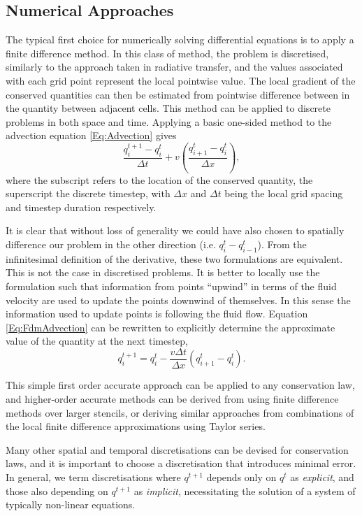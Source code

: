 \subsection{Numerical Approaches}

The typical first choice for numerically solving differential equations is to apply a finite difference method.
In this class of method, the problem is discretised, similarly to the approach taken in radiative transfer, and the values associated with each grid point represent the local pointwise value.
The local gradient of the conserved quantities can then be estimated from pointwise difference between in the quantity between adjacent cells.
This method can be applied to discrete problems in both space and time.
Applying a basic one-sided method to the advection equation \eqref{Eq:Advection} gives
\begin{equation}\label{Eq:FdmAdvection}
    \frac{q^{t+1}_i - q^t_i}{\Delta t} + v\left( \frac{q^t_{i+1} - q^t_i}{\Delta x} \right),
\end{equation}
where the subscript refers to the location of the conserved quantity, the superscript the discrete timestep, with $\Delta x$ and $\Delta t$ being the local grid spacing and timestep duration respectively.

It is clear that without loss of generality we could have also chosen to spatially difference our problem in the other direction (i.e. $q^t_i - q^t_{i-1}$).
From the infinitesimal definition of the derivative, these two formulations are equivalent.
This is not the case in discretised problems.
It is better to locally use the formulation such that information from points ``upwind'' in terms of the fluid velocity are used to update the points downwind of themselves.
In this sense the information used to update points is following the fluid flow.
Equation \eqref{Eq:FdmAdvection} can be rewritten to explicitly determine the approximate value of the quantity at the next timestep,
\begin{equation}
    q^{t+1}_i = q^t_i - \frac{v \Delta t}{\Delta x}\left( q^t_{i+1} - q^t_i \right).
\end{equation}

This simple first order accurate approach can be applied to any conservation law, and higher-order accurate methods can be derived from using finite difference methods over larger stencils, or deriving similar approaches from combinations of the local finite difference approximations using Taylor series.

Many other spatial and temporal discretisations can be devised for conservation laws, and it is important to choose a discretisation that introduces minimal error.
In general, we term discretisations where $q^{t+1}$ depends only on $q^{t}$ as \emph{explicit}, and those also depending on $q^{t+1}$ as \emph{implicit}, necessitating the solution of a system of typically non-linear equations.

